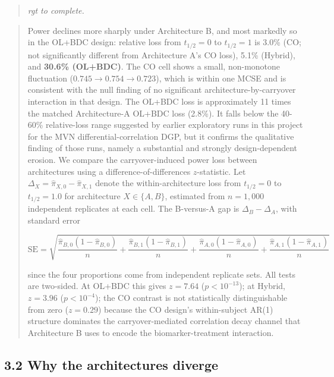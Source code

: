 \documentclass[
  11pt,
]{article}
\newenvironment{rgt}{%
  \begin{quote}\small\itshape\color[RGB]{20,60,160}}{%
  \end{quote}}
\newenvironment{orig}{%
  \begin{quote}\normalsize\color[gray]{0.55}}{%
  \end{quote}}
\begin{document}
\begin{rgt}
rgt to complete.

\end{rgt}

\begin{orig}
Power declines more sharply under Architecture B, and most markedly so
in the OL+BDC design: relative loss from \(t_{1/2} = 0\) to
\(t_{1/2} = 1\) is 3.0\% (CO; not significantly different from
Architecture A's CO loss), 5.1\% (Hybrid), and \textbf{30.6\% (OL+BDC)}.
The CO cell shows a small, non-monotone fluctuation
(\(0.745 \to 0.754 \to 0.723\)), which is within one MCSE and is
consistent with the null finding of no significant
architecture-by-carryover interaction in that design. The OL+BDC loss is
approximately 11 times the matched Architecture-A OL+BDC loss (2.8\%).
It falls below the 40-60\% relative-loss range suggested by earlier
exploratory runs in this project for the MVN differential-correlation
DGP, but it confirms the qualitative finding of those runs, namely a
substantial and strongly design-dependent erosion. We compare the
carryover-induced power loss between architectures using a
difference-of-differences \(z\)-statistic. Let
\(\Delta_X = \hat{\pi}_{X,0} - \hat{\pi}_{X,1}\) denote the
within-architecture loss from \(t_{1/2} = 0\) to \(t_{1/2} = 1.0\) for
architecture \(X \in \{A, B\}\), estimated from \(n = 1{,}000\)
independent replicates at each cell. The B-versus-A gap is
\(\Delta_B - \Delta_A\), with standard error

\[
\text{SE} = \sqrt{
  \frac{\hat{\pi}_{B,0}(1-\hat{\pi}_{B,0})}{n}
+ \frac{\hat{\pi}_{B,1}(1-\hat{\pi}_{B,1})}{n}
+ \frac{\hat{\pi}_{A,0}(1-\hat{\pi}_{A,0})}{n}
+ \frac{\hat{\pi}_{A,1}(1-\hat{\pi}_{A,1})}{n}}
\]

since the four proportions come from independent replicate sets. All
tests are two-sided. At OL+BDC this gives \(z = 7.64\)
(\(p < 10^{-13}\)); at Hybrid, \(z = 3.96\) (\(p < 10^{-4}\)); the CO
contrast is not statistically distinguishable from zero (\(z = 0.29\))
because the CO design's within-subject AR(1) structure dominates the
carryover-mediated correlation decay channel that Architecture B uses to
encode the biomarker-treatment interaction.

\end{orig}

\subsection{3.2 Why the architectures diverge}
\end{document}
